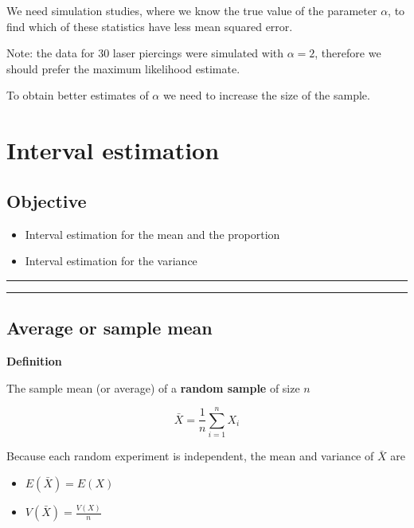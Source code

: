 \documentclass[
]{book}
\providecommand{\tightlist}{%
  \setlength{\itemsep}{0pt}\setlength{\parskip}{0pt}}
\begin{document}
We need simulation studies, where we know the true value of the parameter \(\alpha\), to find which of these statistics have less mean squared error.

Note: the data for 30 laser piercings were simulated with \(\alpha=2\), therefore we should prefer the maximum likelihood estimate.

To obtain better estimates of \(\alpha\) we need to increase the size of the sample.

\hypertarget{interval-estimation}{%
\chapter{Interval estimation}\label{interval-estimation}}

\hypertarget{objective-12}{%
\section{Objective}\label{objective-12}}

\begin{itemize}
\tightlist
\item
  Interval estimation for the mean and the proportion
\item
  Interval estimation for the variance
\end{itemize}

\begin{center}\rule{0.5\linewidth}{0.5pt}\end{center}

\begin{center}\rule{0.5\linewidth}{0.5pt}\end{center}

\hypertarget{average-or-sample-mean-1}{%
\section{Average or sample mean}\label{average-or-sample-mean-1}}

\textbf{Definition}

The sample mean (or average) of a \textbf{random sample} of size \(n\)

\[\bar{X}=\frac{1}{n}\sum_{i=1}^n X_i\]

Because each random experiment is independent, the mean and variance of \(\bar{X}\) are

\begin{itemize}
\tightlist
\item
  \(E(\bar{X})=E(X)\)
\item
  \(V(\bar{X})=\frac{V(X)}{n}\)
\end{itemize}
\end{document}

